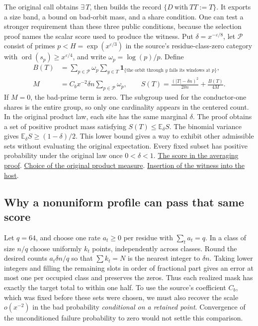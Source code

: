 The original call obtains \(\exists\,T\), then builds the record \(\{D\ \mathrm{with}\ TT:=T\}\). It exports a size band, a bound on bad-orbit mass, and a share condition. One can test a stronger requirement than these three public conditions, because the selection proof names the scalar score used to produce the witness. Put \(\delta=x^{-\varepsilon/8}\), let \(\mathcal P\) consist of primes \(p< H=\exp(x^{\varepsilon/3})\) in the source's residue-class-zero category with \(\operatorname{ord}(s_p)\ge x^{\varepsilon/4}\), and write \(\omega_p=\log(p)/p\). Define
\begin{align*}
 B(T)&=\sum_{p\in\mathcal P}\omega_p
   \sum_{y\in T}\mathbf 1_{\{\text{the orbit through }y\text{ fails its windows at }p\}},\\
 M&=C_bx^{-2}\delta n\sum_{p\in\mathcal P}\omega_p,\qquad
 S(T)=\frac{(|T|-\delta n)^2}{2\delta n}+\frac{B(T)}{4M}.
\end{align*}
If \(M=0\), the bad-prime term is zero. The subgroup used for the conductor-one shares is the entire group, so only one cardinality appears in the centered count. In the original product law, each site has the same marginal \(\delta\). The proof obtains a set of positive product mass satisfying \(S(T)\le\mathbb E_\delta S\). The binomial variance gives \(\mathbb E_\delta S\ge(1-\delta)/2\). This lower bound gives a way to exhibit other admissible sets without evaluating the original expectation. Every fixed subset has positive probability under the original law once \(0<\delta<1\).
\href{https://github.com/nousentllc/riemann-hypothesis/blob/40e56bab026552e089d7afcfeff08d2defb9c005/src/Development/AutomorphicArithmetic/ThickFrames/select.lean#L136-L173}{The score in the averaging proof}.
\href{https://github.com/nousentllc/riemann-hypothesis/blob/40e56bab026552e089d7afcfeff08d2defb9c005/src/Development/AutomorphicArithmetic/ThickFrames/topsGroup.lean#L88-L123}{Choice of the original product measure}.
\href{https://github.com/nousentllc/riemann-hypothesis/blob/40e56bab026552e089d7afcfeff08d2defb9c005/src/Development/AutomorphicArithmetic/ShortNorms/hostOfFieldOf.lean#L217-L229}{Insertion of the witness into the host}.

\subsection{Why a nonuniform profile can pass that same score}

Let \(q=64\), and choose one rate \(a_t\ge0\) per residue with \(\sum_t a_t=q\). In a class of size \(n/q\) choose uniformly \(k_t\) points, independently across classes. Round the desired counts \(a_t\delta n/q\) so that \(\sum k_t=N\) is the nearest integer to \(\delta n\). Taking lower integers and filling the remaining slots in order of fractional part gives an error at most one per occupied class and preserves the zeros. Thus each realized mask has exactly the target total to within one half. To use the source's coefficient \(C_b\), which was fixed before these sets were chosen, we must also recover the scale \(o(x^{-2})\) in the bad probability \emph{conditional on a retained point}. Convergence of the unconditioned failure probability to zero would not settle this comparison.

